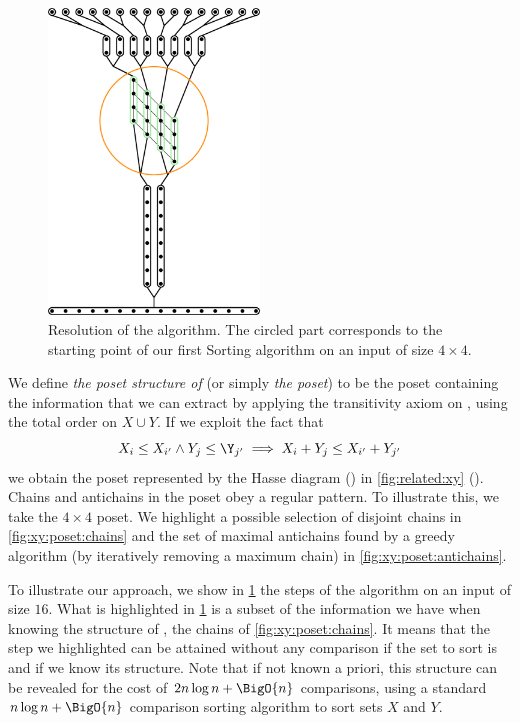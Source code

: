 \begin{figure}
\centering
\includegraphics[width=0.5\textwidth,angle=90]{fig/x+y/poset/mergexy}
\caption{Resolution of the \mergesort algorithm. The circled part
corresponds to the starting point of our first Sorting \XY algorithm on an
input of size \(4 \times 4\).}
\label{fig:xy:poset:mergexy}
\end{figure}

We define \emph{the poset structure of \XY} (or simply \emph{the \XY poset}) to be the poset
containing the information that we can extract by applying the
transitivity axiom on \XY, using the total order on \(X \cup Y\). If we exploit the fact that
\begin{displaymath}
X_i \le X_{i'} \land Y_j \le \Y_{j'} \implies X_i + Y_j \le X_{i'} + Y_{j'}
\end{displaymath}
we obtain the poset represented by the Hasse diagram ()
in \ref{fig:related:xy} ().
Chains and antichains
in the \XY poset obey a regular pattern. To illustrate this, we take the $4 \times 4$
\XY poset. We highlight a possible selection of disjoint chains in
\ref{fig:xy:poset:chains} and the set of maximal antichains found by a greedy
algorithm (by iteratively removing a maximum chain) in \ref{fig:xy:poset:antichains}.

To illustrate our approach, we show in \ref{fig:xy:poset:mergexy} the steps of
the \mergesort algorithm on an input of size \(16\).
What is highlighted in \ref{fig:xy:poset:mergexy} is a subset of the
information we have when knowing the structure of \XY, \ie the chains of
\ref{fig:xy:poset:chains}. It means that the step we
highlighted can be attained without any comparison if the set to sort is \XY
and if we know its structure. Note that if not known a priori, this structure
can be revealed for the cost of \(2n \log n + \BigO{n}\) comparisons, using a standard \(n
\log n + \BigO{n}\) comparison sorting algorithm to sort sets \(X\) and \(Y\).

